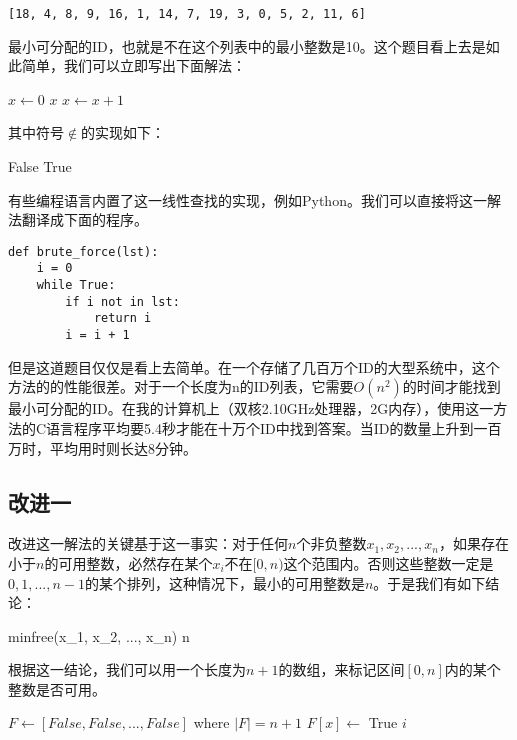 \documentclass[UTF8]{article}
\begin{document}
\begin{verbatim}
[18, 4, 8, 9, 16, 1, 14, 7, 19, 3, 0, 5, 2, 11, 6]
\end{verbatim}

最小可分配的ID，也就是不在这个列表中的最小整数是10。这个题目看上去是如此简单，我们可以立即写出下面解法：

\begin{algorithmic}[1]
  \State $x \gets 0$
  \Loop
      \State \Return $x$
    \Else
      \State $x \gets x + 1$
    \EndIf
  \EndLoop
\EndFunction
\end{algorithmic}

其中符号$\notin$的实现如下：

\begin{algorithmic}[1]
      \State \Return False
    \EndIf
  \EndFor
  \State \Return True
\EndFunction
\end{algorithmic}

有些编程语言内置了这一线性查找的实现，例如Python。我们可以直接将这一解法翻译成下面的程序。

\lstset{language=Python}
\begin{lstlisting}
def brute_force(lst):
    i = 0
    while True:
        if i not in lst:
            return i
        i = i + 1
\end{lstlisting}

但是这道题目仅仅是看上去简单。在一个存储了几百万个ID的大型系统中，这个方法的的性能很差。对于一个长度为n的ID列表，它需要$O(n^2)$的时间才能找到最小可分配的ID。在我的计算机上（双核2.10GHz处理器，2G内存），使用这一方法的C语言程序平均要5.4秒才能在十万个ID中找到答案。当ID的数量上升到一百万时，平均用时则长达8分钟。

\subsection{改进一}
改进这一解法的关键基于这一事实：对于任何$n$个非负整数$x_1, x_2, ..., x_n$，如果存在小于$n$的可用整数，必然存在某个$x_i$不在$[0, n)$这个范围内。否则这些整数一定是$0, 1, ..., n-1$的某个排列，这种情况下，最小的可用整数是$n$。于是我们有如下结论：

\be
minfree(x_1, x_2, ..., x_n) \leq n
\label{eq:min-free}
\ee

根据这一结论，我们可以用一个长度为$n+1$的数组，来标记区间$[0, n]$内的某个整数是否可用。

\begin{algorithmic}[1]
  \State $F \gets [False, False, ..., False]$ where $|F| = n+1$
      \State $F[x] \gets$ True
    \EndIf
  \EndFor
      \State \Return $i$
    \EndIf
  \EndFor
\EndFunction
\end{algorithmic}
\end{document}

